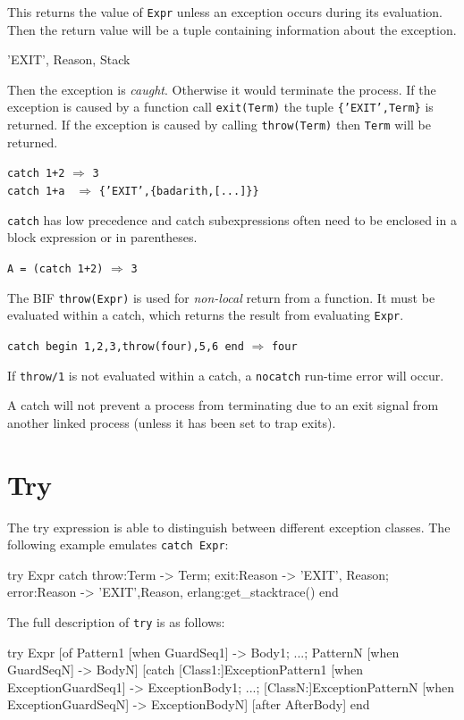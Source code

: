 This returns the value of \texttt{Expr} unless an exception occurs
during its evaluation. Then the return value will be a tuple
containing information about the exception.

\begin{erlang}
{'EXIT', {Reason, Stack}}
\end{erlang}

Then the exception is \textit{caught}. Otherwise it would terminate
the process. If the exception is caused by a function call
\texttt{exit(Term)} the tuple \texttt{\{'EXIT',Term\}} is returned. If
the exception is caused by calling \texttt{throw(Term)} then
\texttt{Term} will be returned.

\texttt{catch 1+2} $\Rightarrow$ \texttt{3}\\
\texttt{catch 1+a } $\Rightarrow$ \texttt{\{'EXIT',\{badarith,[...]\}\}}

\texttt{catch} has low precedence and catch subexpressions often need
to be enclosed in a block expression or in parentheses.

\texttt{A = (catch 1+2)} $\Rightarrow$ \texttt{3}

The BIF \texttt{throw(Expr)} is used for \textit{non-local} return
from a function. It must be evaluated within a catch, which returns
the result from evaluating \texttt{Expr}.

\texttt{catch begin 1,2,3,throw(four),5,6 end}  $\Rightarrow$  \texttt{four}

If \texttt{throw/1} is not evaluated within a catch, a
\texttt{nocatch} run-time error will occur.

A catch will not prevent a process from terminating due to an exit
signal from another linked process (unless it has been set to trap
exits).


\section{Try}
\label{errorhandling:try}
The try expression is able to distinguish between different exception
classes. The following example emulates \texttt{catch Expr}:

\begin{erlang}
try Expr
catch
    throw:Term -> Term;
    exit:Reason -> {'EXIT', Reason};
    error:Reason -> {'EXIT',{Reason, erlang:get_stacktrace()}}
end
\end{erlang}

The full description of \texttt{try} is as follows:

\begin{erlang}
try Expr [of
    Pattern1 [when GuardSeq1] -> Body1;
    ...;
    PatternN [when GuardSeqN] -> BodyN]
[catch
    [Class1:]ExceptionPattern1 [when ExceptionGuardSeq1] -> ExceptionBody1;
    ...;
    [ClassN:]ExceptionPatternN [when ExceptionGuardSeqN] -> ExceptionBodyN]
[after AfterBody]
end
\end{erlang}

